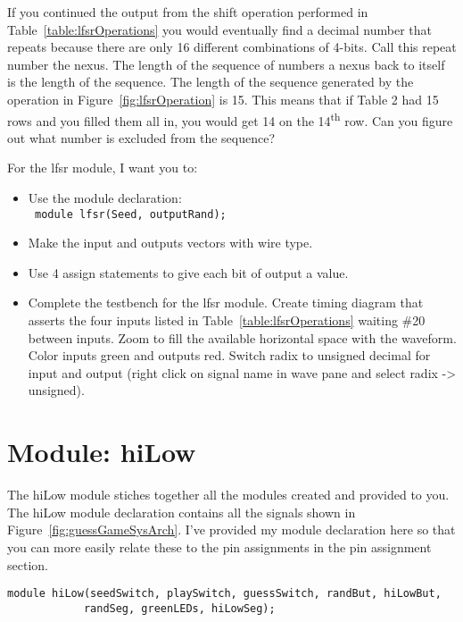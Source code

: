 If you continued the output from the shift operation performed in Table~\ref{table:lfsrOperations} 
you would eventually find a decimal number that repeats because there
are only 16 different combinations of 4-bits. Call this repeat number
the nexus. The length of the sequence of numbers a nexus back to itself
is the length of the sequence. The length of the sequence generated by
the operation in Figure~\ref{fig:lfsrOperation} is 15. This means that if Table 2 had 15 rows
and you filled them all in, you would get 14 on the
14\textsuperscript{th} row. Can you figure out what number is excluded
from the sequence?

For the lfsr module, I want you to:

\begin{itemize}
\item
  Use the module declaration:\\
\verb+ module lfsr(Seed, outputRand);+

\item
  Make the input and outputs vectors with wire type.
\item
  \protect\hypertarget{lfsr_verilog}{}{}Use 4 assign statements to give
  each bit of output a value.
\item
  \protect\hypertarget{lfsr_testbench}{}{}Complete the testbench for the
  lfsr module. Create timing diagram that asserts the four inputs listed
  in Table~\ref{table:lfsrOperations} 
  waiting \#20 between inputs. Zoom to fill the available
  horizontal space with the waveform. Color inputs green and outputs
  red. Switch radix to unsigned decimal for input and output (right
  click on signal name in wave pane and select radix -\textgreater{}
  unsigned).
\end{itemize}

\hypertarget{hilow-module}{%
\section{Module: hiLow}\label{hilow-module}}

The hiLow module stiches together all the modules created and provided
to you. The hiLow module declaration contains all the signals shown in
Figure~\ref{fig:guessGameSysArch}. I've provided my module declaration here so that you can more
easily relate these to the pin assignments in the pin assignment
section.

\begin{verbatim}
module hiLow(seedSwitch, playSwitch, guessSwitch, randBut, hiLowBut,
			randSeg, greenLEDs, hiLowSeg);
\end{verbatim}

